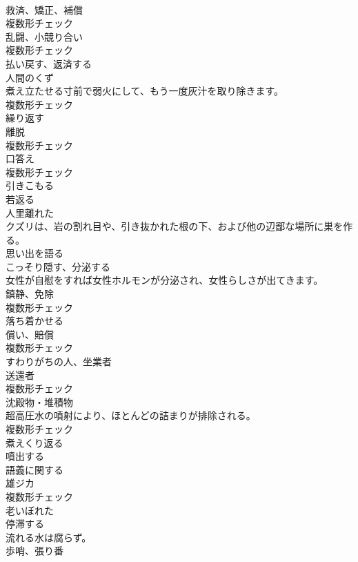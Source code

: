 \documentclass[8pt]{extreport}
\begin{document}
\begin{CJK}{UTF8}{min}
\\	[名詞]	救済、矯正、補償	
\\	複数形チェック
\\	[名詞]	乱闘、小競り合い	
\\	複数形チェック
\\	[動詞]	払い戻す、返済する	
\\	[名詞]	人間のくず	
\\	煮え立たせる寸前で弱火にして、もう一度灰汁を取り除きます。	
\\	複数形チェック
\\	[動詞]	繰り返す	
\\	[名詞]	離脱	
\\	複数形チェック
\\	[名詞]	口答え	
\\	複数形チェック
\\	[動詞]	引きこもる	
\\	[動詞]	若返る	
\\	[形容詞]	人里離れた	
\\	クズリは、岩の割れ目や、引き抜かれた根の下、および他の辺鄙な場所に巣を作る。	
\\	[動詞]	思い出を語る	
\\	[動詞]	こっそり隠す、分泌する	
\\	女性が自慰をすれば女性ホルモンが分泌され、女性らしさが出てきます。	
\\	[名詞]	鎮静、免除	
\\	複数形チェック
\\	[動詞]	落ち着かせる	
\\	[名詞]	償い、賠償	
\\	複数形チェック
\\	[形容詞]	すわりがちの人、坐業者	
\\	[名詞]	送還者	
\\	複数形チェック
\\	[名詞]	沈殿物・堆積物	
\\	超高圧水の噴射により、ほとんどの詰まりが排除される。	
\\	複数形チェック
\\	[動詞]	煮えくり返る	
\\	[動詞]	噴出する	
\\	[形容詞]	語義に関する	
\\	[名詞]	雄ジカ	
\\	複数形チェック
\\	[形容詞]	老いぼれた	
\\	[動詞]	停滞する	
\\	流れる水は腐らず。	
\\	[名詞]	歩哨、張り番	

\end{CJK}
\end{document}
